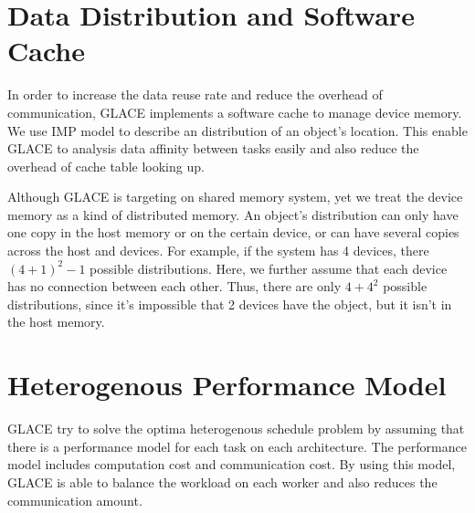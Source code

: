 \documentclass[preprint,11pt]{elsarticle}
\begin{document}
\section{Data Distribution and Software Cache}
  In order to increase the data reuse rate and reduce the overhead of communication, GLACE
  implements a software cache to manage device memory. We use IMP model \cite{} to 
  describe an distribution of an object's location. This enable GLACE to analysis data affinity
  between tasks easily and also reduce the overhead of cache table looking up.
  
  Although GLACE is targeting on shared memory system, yet we treat the device memory
  as a kind of distributed memory. An object's distribution can only have one copy in the 
  host memory or on the certain device, or can have several copies across the host and
  devices. For example, if the system has 4 devices, there $(4+1)^2 - 1$ possible distributions.
  Here, we further assume that each device has no connection between each other. Thus,
  there are only $4 + 4^2$ possible distributions, since it's impossible that 2 devices have 
  the object, but it isn't in the host memory. 
    
\section{Heterogenous Performance Model}
  GLACE try to solve the optima heterogenous schedule problem by assuming that there is 
  a performance model for each task on each architecture. The performance model includes
  computation cost and communication cost. By using this model, GLACE is able to balance
  the workload on each worker and also reduces the communication amount.  
\end{document}
